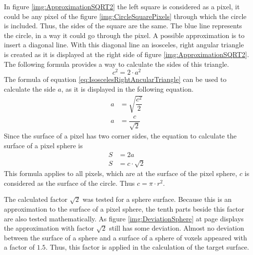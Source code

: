 In figure \ref{img:ApproximationSQRT2} the left square is considered as a pixel, it could be any pixel of the figure \ref{img:CircleSquarePixels} through which the circle is included. Thus, the sides of the square are the same. The blue line represents the circle, in a way it could go through the pixel. A possible approximation is to insert a diagonal line. With this diagonal line an isosceles, right angular triangle is created as it is displayed at the right side of figure \ref{img:ApproximationSQRT2}. \newline
The following formula provides a way to calculate the sides of this triangle.
\begin{equation}\label{eq:IsoscelesRightAncularTriangle}
c^{2} = 2 \cdot a^{2}
\end{equation}
The formula of equation \ref{eq:IsoscelesRightAncularTriangle} can be used to calculate the side $a$, as it is displayed in the following equation.
\begin{equation}\label{eq:CornerSideAOfTriangle}
\begin{split}
a &= \sqrt{\dfrac{c^{2}}{2}} \\
a &= \dfrac{c}{\sqrt{2}}
\end{split}
\end{equation}
Since the surface of a pixel has two corner sides, the equation to calculate the surface of a pixel sphere is
\begin{equation}\label{eq:PixelSurfaceCalculation}
\begin{split}
S &= 2a \\
S &= c \cdot \sqrt{2}
\end{split}
\end{equation}
This formula applies to all pixels, which are at the surface of the pixel sphere, $c$ is considered as the surface of the circle. Thus $c = \pi \cdot r^{2}$.

The calculated factor $\sqrt{2}$ was tested for a sphere surface. Because this is an approximation to the surface of a pixel sphere, the tenth parts beside this factor are also tested mathematically. As figure \ref{img:DeviationSphere} at page \pageref{img:DeviationSphere} displays the  approximation with factor $\sqrt{2}$ still has some deviation. Almost no deviation between the surface of a sphere and a surface of a sphere of voxels appeared with a factor of $1.5$. Thus, this factor is applied in the calculation of the target surface. 

